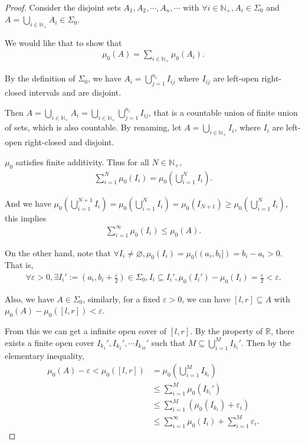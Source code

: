 \begin{proof}[Proof]
    Consider the disjoint sets $A_1, A_2,\cdots, A_n,\cdots  $ with $\forall i \in \mathbb{N} _+, A_i \in \Sigma_0$ and $A = \bigcup_{i \in \mathbb{N} _+} A_i \in \Sigma_0$.

    We would like that to show that 
    \begin{align*}
        \mu_0(A) = \sum _{i\in\mathbb{N} _+} \mu_0(A_i)
    .\end{align*}

    By the definition of $\Sigma_0$, we have $A_i = \bigcup_{j=1}^{n_i} I_{ij}$ where $I_{ij}$ are left-open right-closed intervals and are disjoint.

    Then $A = \bigcup_{i\in\mathbb{N} _+} A_i = \bigcup_{i\in\mathbb{N} _+}\bigcup_{j=1}^{n_i} I_{ij}$, that is a countable union of finite union of sets, which is also countable. By renaming, let $A = \bigcup_{i\in\mathbb{N} _+} I_i$, where $I_i$ are left-open right-closed and disjoint.
    
    $\mu_0$ satisfies finite additivity. Thus for all $N \in \mathbb{N} _+$,
    \begin{align*}
        \sum_{i=1}^N \mu_0(I_i) = \mu_0(\bigcup_{i=1}^N I_i)
    .\end{align*}

    And we have $\mu_0(\bigcup_{i=1}^{N+1} I_i) = \mu_0(\bigcup_{i=1}^N I_i) = \mu_0(I_{N+1}) \ge  \mu_0(\bigcup_{i=1}^N I_i)$, this implies
    \begin{align*}
        \sum_{i=1}^\infty \mu_0(I_i) \le \mu_0(A)
    .\end{align*}

    On the other hand, note that $\forall I_i \neq \varnothing, \mu_0(I_i) = \mu_0((a_i,b_i]) = b_i - a_i > 0$. That is, 
    \begin{align*}
        \forall \varepsilon > 0, \exists I_i' := (a_i, b_i + \frac{\varepsilon}{2} ) \in \Sigma_0, I_i \subseteq I_i', \mu_0(I_i') - \mu_0(I_i) = \frac{\varepsilon}{2} < \varepsilon
    .\end{align*}

    Also, we have $A \in \Sigma_0$, similarly, for a fixed $\varepsilon >0$, we can have $[l, r] \subseteq A$ with $\mu_0(A) - \mu_0([l, r]) < \varepsilon $.

    From this we can get a infinite open cover of $[l, r]$. By the property of $\mathbb{R} $, there exists a finite open cover $I_{k_1}', I_{k_2}',\cdots I_{k_M}'$ such that $M \subseteq \bigcup_{i=1}^M I_{k_i}'$. Then by the elementary inequality, 
    \begin{align*}
        \mu_0(A) - \varepsilon < \mu_0([l, r]) &= \mu_0(\bigcup_{i=1}^M I_{k_i}) \\
                                               &\le \sum_{i=1}^M \mu_0(I_{k_i}')  \\
                                               &\le \sum_{i=1}^M (\mu_0(I_{k_i}) + \varepsilon_i)  \\
                                               &\le \sum_{i=1}^\infty \mu_0(I_i) + \sum_{i=1}^M \varepsilon_i
   .\end{align*}


\end{proof}
